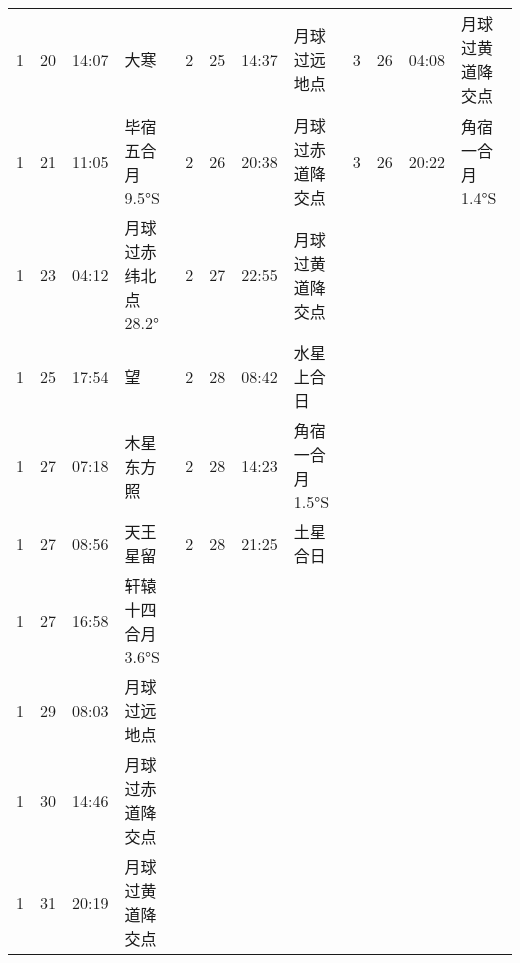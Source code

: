\begin{tabular}{llll|llll|llll}
1 & 20 & 14:07 & 大寒 & 2 & 25 & 14:37 & 月球过远地点 & 3 & 26 & 04:08 & 月球过黄道降交点 \tabularnewline
1 & 21 & 11:05 & 毕宿五合月 9.5°S & 2 & 26 & 20:38 & 月球过赤道降交点 & 3 & 26 & 20:22 & 角宿一合月 1.4°S \tabularnewline
1 & 23 & 04:12 & 月球过赤纬北点 28.2° & 2 & 27 & 22:55 & 月球过黄道降交点 &  &  &  &  \tabularnewline
1 & 25 & 17:54 & 望 & 2 & 28 & 08:42 & 水星上合日 &  &  &  &  \tabularnewline
1 & 27 & 07:18 & 木星东方照 & 2 & 28 & 14:23 & 角宿一合月 1.5°S &  &  &  &  \tabularnewline
1 & 27 & 08:56 & 天王星留 & 2 & 28 & 21:25 & 土星合日 &  &  &  &  \tabularnewline
1 & 27 & 16:58 & 轩辕十四合月 3.6°S &  &  &  &  &  &  &  &  \tabularnewline
1 & 29 & 08:03 & 月球过远地点 &  &  &  &  &  &  &  &  \tabularnewline
1 & 30 & 14:46 & 月球过赤道降交点 &  &  &  &  &  &  &  &  \tabularnewline
1 & 31 & 20:19 & 月球过黄道降交点 &  &  &  &  &  &  &  &  \tabularnewline
\hline \end{tabular}

